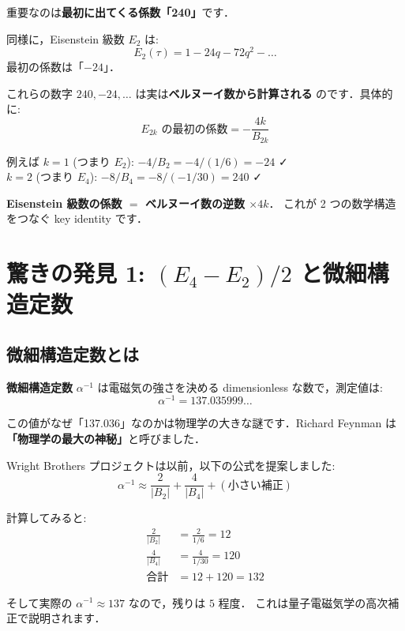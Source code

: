 \documentclass[11pt,a4paper]{article}
\begin{document}
重要なのは\textbf{最初に出てくる係数「240」}です．

同様に，Eisenstein 級数 $E_2$ は:
\begin{equation*}
E_2(\tau) = 1 - 24 q - 72 q^2 - \ldots
\end{equation*}
最初の係数は「$-24$」．

これらの数字 $240, -24, \ldots$ は実は\textbf{ベルヌーイ数から計算される}
のです．具体的に:
\begin{equation*}
E_{2k}\text{ の最初の係数} = -\frac{4k}{B_{2k}}
\end{equation*}

例えば $k = 1$ (つまり $E_2$): $-4/B_2 = -4/(1/6) = -24$ ✓\\
$k = 2$ (つまり $E_4$): $-8/B_4 = -8/(-1/30) = 240$ ✓

\textbf{Eisenstein 級数の係数 $=$ ベルヌーイ数の逆数 $\times 4k$}．
これが 2 つの数学構造をつなぐ key identity です．

\section{驚きの発見 1: $(E_4 - E_2)/2$ と微細構造定数}

\subsection{微細構造定数とは}

\textbf{微細構造定数} $\alpha^{-1}$ は電磁気の強さを決める
dimensionless な数で，測定値は:
\begin{equation*}
\alpha^{-1} = 137.035999\ldots
\end{equation*}

この値がなぜ「137.036」なのかは物理学の大きな謎です．Richard Feynman は
\textbf{「物理学の最大の神秘」}と呼びました．

Wright Brothers プロジェクトは以前，以下の公式を提案しました:
\begin{equation*}
\alpha^{-1} \approx \frac{2}{|B_2|} + \frac{4}{|B_4|} + (\text{小さい補正})
\end{equation*}

計算してみると:
\begin{align*}
\frac{2}{|B_2|} &= \frac{2}{1/6} = 12\\
\frac{4}{|B_4|} &= \frac{4}{1/30} = 120\\
\text{合計} &= 12 + 120 = 132
\end{align*}

そして実際の $\alpha^{-1} \approx 137$ なので，残りは $5$ 程度．
これは量子電磁気学の高次補正で説明されます．
\end{document}
